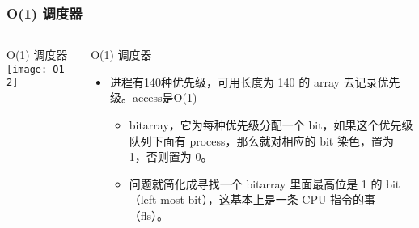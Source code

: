 \begin{frame}
	\frametitle{ O(1) 调度器}
	\begin{columns}
		\begin{column}{.4\textwidth}
			\Large \centering
			O(1) 调度器
			\texttt{[image: O1-2]}
			
		\end{column}
		
		\begin{column}{.6\textwidth}
			O(1) 调度器\\
			
			\begin{itemize}
				\item 进程有140种优先级，可用长度为 140 的 array 去记录优先级。access是O(1)
				
					\begin{itemize}
					\item bitarray，它为每种优先级分配一个 bit，如果这个优先级队列下面有 process，那么就对相应的 bit 染色，置为 1，否则置为 0。
					
					\item 问题就简化成寻找一个 bitarray 里面最高位是 1 的 bit（left-most bit），这基本上是一条 CPU 指令的事（fls）。
					
					\end{itemize}
				
			\end{itemize}
		\end{column}
	\end{columns}
\end{frame}

